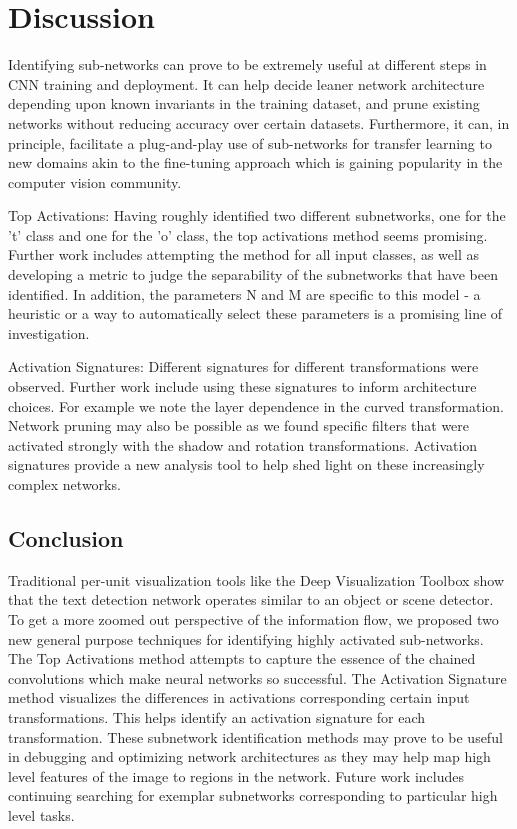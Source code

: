 \documentclass[10pt,twocolumn,letterpaper]{article}
\begin{document}
\section{Discussion}
Identifying sub-networks can prove to be extremely useful at different steps in CNN training and deployment. It can help decide leaner network architecture depending upon known invariants in the training dataset, and prune existing networks without reducing accuracy over certain datasets. Furthermore, it can, in principle, facilitate a plug-and-play use of sub-networks for transfer learning to new domains akin to the fine-tuning approach which is gaining popularity in the computer vision community.

Top Activations:
Having roughly identified two different subnetworks, one for the 't' class and one for the 'o' class, the top activations method seems promising. Further work includes attempting the method for all input classes, as well as developing a metric to judge the separability of the subnetworks that have been identified. In addition, the parameters N and M are specific to this model - a heuristic or a way to automatically select these parameters is a promising line of investigation.

Activation Signatures:
Different signatures for different transformations were observed. Further work include using these signatures to inform architecture choices. For example we note the layer dependence in the curved transformation. Network pruning may also be possible as we found specific filters that were activated strongly with the shadow and rotation transformations. Activation signatures provide a new analysis tool to help shed light on these increasingly complex networks. 



\subsection{Conclusion}
Traditional per-unit visualization tools like the Deep Visualization Toolbox \cite{yosinski2015understanding} show that the text detection network operates similar to an object or scene detector. To get a more zoomed out perspective of the information flow, we proposed two new general purpose techniques for identifying highly activated sub-networks. The Top Activations method attempts to capture the essence of the chained convolutions which make neural networks so successful. The Activation Signature method visualizes the differences in activations corresponding certain input transformations. This helps identify an activation signature for each transformation. These subnetwork identification methods may prove to be useful in debugging and optimizing network architectures as they may help map high level features of the image to regions in the network. Future work includes continuing searching for exemplar subnetworks corresponding to particular high level tasks.




{\small


}
\end{document}
